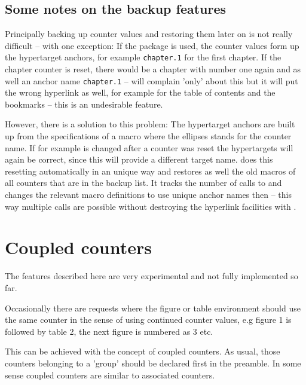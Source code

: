 \documentclass[12pt,a4paper,oneside]{article}
\makeatletter
\newcommand{\chdocextractversion}[1]{%
  \@nameuse{#1}%
}
\newcommand{\CHDocNew}[1]{%
  \tcbdocmarginnote[doclang/new={N},
  colframe=blue,
  halign=left,
  colback={blue!20!white},
  fontupper={\tiny}
  ]{%
    \chdocextractversion{xassoccntversion#1}%
  }%
}
\makeatother
\begin{document}
\subsection{Some notes on the backup features} \label{subsec::backup_and_hyperref}

Principally backing up counter values and restoring them later on is not really difficult -- with one exception: If the  package is used, the counter values form up the hypertarget anchors, for example \texttt{chapter.1} for the first chapter. If the chapter counter is reset, there would be a chapter with number one again and as well an anchor name \texttt{chapter.1} --  will complain 'only' about this but it will put the wrong hyperlink as well, for example for the table of contents and the bookmarks -- this is an undesirable feature.

However, there is a solution to this problem: The hypertarget anchors are built up from the specifications of a macro  where the ellipses stands for the counter name. If for example  is changed after a counter was reset the hypertargets will again be correct, since this will provide a different target name.  does this resetting automatically in an unique way and  restores as well the old  macros of all counters that are in the backup list. It tracks the number of calls to  and changes the relevant  macro definitions to use unique anchor names then -- this way multiple  calls are possible without destroying the hyperlink facilities with . 


\section{Coupled counters}\label{sec::coupledcounters}\CHDocNew{0.5}

\begin{marker}
The features described here are very experimental and not fully implemented so far. 
\end{marker}

Occasionally there are requests where the figure or table environment should use the same counter in the sense of using continued counter values, e.g figure 1 is followed by table 2, the next figure is numbered as 3 etc. 

This can be achieved with the concept of coupled counters. As usual, those counters belonging to a 'group' should be declared first in the preamble. In some sense coupled counters are similar to associated counters. 
\end{document}

